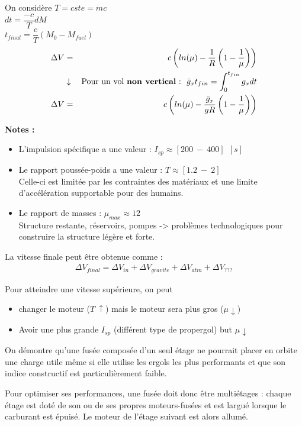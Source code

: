 \documentclass{report}
\begin{document}
On considère $T=cste=\dot{m}c$\\
$dt=\dfrac{-c}{T}dM$\\
$t_{final}=\dfrac{c}{T}(M_0-M_{fuel})$
\begin{eqnarray}
\Delta V &= &c\left(ln(\mu)-\dfrac{1}{R}\left(1-\dfrac{1}{\mu}\right)\right)\\
 &\downarrow &\text{Pour un vol \textbf{non vertical} :}~~ \bar{g}_xt_{fin}=\int_0^{t_{fin}} g_x dt\\
\Delta V &= &c\left(ln(\mu)-\dfrac{\bar{g}_x}{gR}\left(1-\dfrac{1}{\mu}\right)\right)
\end{eqnarray}

\textbf{Notes :}
\begin{itemize}
    \item L'impulsion spécifique a une valeur : $I_{sp}\approx [200~-~400]~~[s]$
    \item Le rapport poussée-poids a une valeur : $T\approx [1.2~-~2]$\\
    Celle-ci est limitée par les contraintes des matériaux et une limite d'accélération supportable pour des humains.
    \item Le rapport de masses : $\mu_{max}\approx 12$\\
    Structure restante, réservoirs, pompes -> problèmes technologiques pour construire la structure légère et forte.
\end{itemize}

La vitesse finale peut être obtenue comme :
\begin{eqnarray}
\Delta V_{final} = \Delta V_{in}+\Delta V_{gravite} +\Delta V_{atm}+\Delta V_{???}
\end{eqnarray}

Pour atteindre une vitesse supérieure, on peut 
\begin{itemize}
    \item changer le moteur ($T~\uparrow$) mais le moteur sera plus gros ($\mu \downarrow$)
    \item Avoir une plus grande $I_{sp}$ (différent type de propergol) but $\mu \downarrow$
\end{itemize}

On démontre qu'une fusée composée d'un seul étage ne pourrait placer en orbite une charge utile même si elle utilise les ergols les plus performants et que son indice constructif est particulièrement faible.

Pour optimiser ses performances, une fusée doit donc être multiétages : chaque étage est doté de son ou de ses propres moteurs-fusées et est largué lorsque le carburant est épuisé. Le moteur de l'étage suivant est alors allumé.
\end{document}
